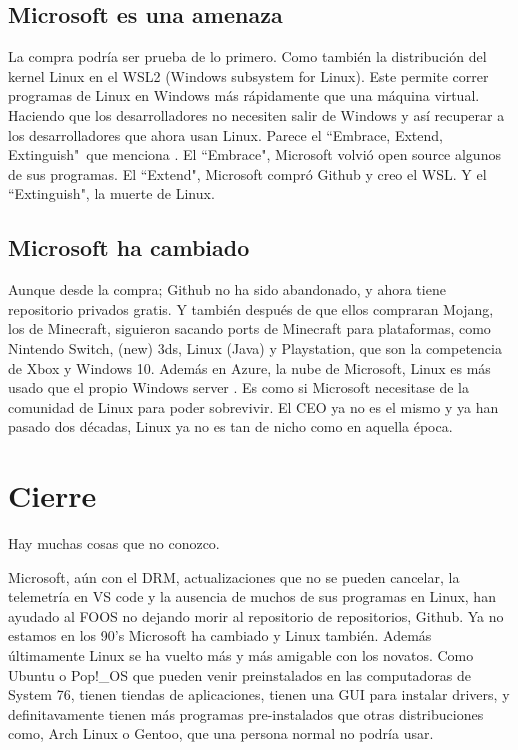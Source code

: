 \documentclass[12pt, twoside]{article}
\begin{document}
\subsection{Microsoft es una amenaza}%
\label{sub:Microsoft es una amenaza}

La compra podría ser prueba de lo primero.
Como también la distribución del kernel Linux en el WSL2 (Windows subsystem for Linux). \citet{WSL2}
Este permite correr programas de Linux en Windows más rápidamente que una máquina virtual.
Haciendo que los desarrolladores no necesiten salir de Windows y así recuperar a los desarrolladores que ahora usan Linux. \citet{STACK}
Parece el ``Embrace, Extend, Extinguish"\ que menciona \citet{WSL2}.
El ``Embrace", Microsoft volvió open source algunos de sus programas.
El ``Extend", Microsoft compró Github y creo el WSL.
Y el ``Extinguish", la muerte de Linux.
\subsection{Microsoft ha cambiado}%
\label{sub:Microsoft ha cambiado}

Aunque desde la compra; Github no ha sido abandonado, y ahora tiene repositorio privados gratis.
Y también después de que ellos compraran Mojang, los de Minecraft, siguieron sacando ports de Minecraft para plataformas,
como Nintendo Switch, (new) 3ds, Linux (Java) y Playstation, que son la competencia de Xbox y Windows 10.
Además en Azure, la nube de Microsoft, Linux es más usado que el propio Windows server \citet{AZURE}.
Es como si Microsoft necesitase de la comunidad de Linux para poder sobrevivir.
El CEO ya no es el mismo y ya han pasado dos décadas, Linux ya no es tan de nicho como en aquella época.

\section{Cierre}%
\label{sec:Cierre}

Hay muchas cosas que no conozco.

Microsoft, aún con el DRM, actualizaciones que no se pueden cancelar, la telemetría en VS code y la ausencia de muchos de sus programas en Linux,
han ayudado al FOOS no dejando morir al repositorio de repositorios, Github.
Ya no estamos en los 90's Microsoft ha cambiado y Linux también.
Además últimamente Linux se ha vuelto más y más amigable con los novatos.
Como Ubuntu o Pop!\_OS que pueden venir preinstalados en las computadoras de System 76,
tienen tiendas de aplicaciones,
tienen una GUI para instalar drivers,
y definitavamente tienen más programas pre-instalados que otras distribuciones como,
Arch Linux o Gentoo, que una persona normal no podría usar.
\end{document}
